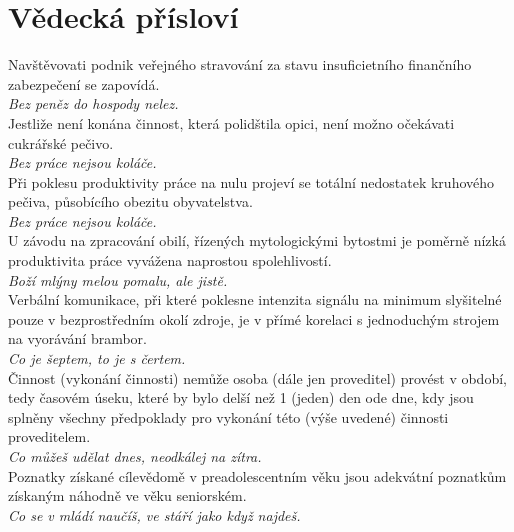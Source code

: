 
\section{Vědecká přísloví}
\begin{multicols}{2}

\noindent
Navštěvovati podnik veřejného stravování za stavu insuficietního
finančního zabezpečení se zapovídá.\\[1 mm]
{\sl Bez peněz do hospody nelez.}\\

\noindent
Jestliže není konána činnost, která polidštila opici, není
možno očekávati cukrářské pečivo.\\[1 mm]
{\sl Bez práce nejsou koláče.}\\

\noindent
Při poklesu produktivity práce na nulu projeví se totální
nedostatek kruhového pečiva, působícího obezitu obyvatelstva.\\[1 mm]
{\sl Bez práce nejsou koláče.}\\

\noindent
U závodu na zpracování obilí, řízených mytologickými bytostmi
je poměrně nízká produktivita práce vyvážena naprostou
spolehlivostí.\\[1 mm]
{\sl Boží mlýny melou pomalu, ale jistě.}\\

\noindent
Verbální komunikace, při které poklesne intenzita signálu na minimum
slyšitelné pouze v bezprostředním okolí zdroje, je v přímé korelaci
s jednoduchým strojem na vyorávání brambor.\\[1 mm]
{\sl Co je šeptem, to je s čertem.}\\

\noindent
Činnost (vykonání činnosti) nemůže osoba (dále jen proveditel)
provést v období, tedy časovém úseku, které by bylo delší než 1 (jeden)
den ode dne, kdy jsou splněny všechny předpoklady pro vykonání této
(výše uvedené) činnosti proveditelem.\\[1 mm]
{\sl Co můžeš udělat dnes, neodkálej na zítra.}\\

\noindent
Poznatky získané cílevědomě v preadolescentním věku jsou adekvátní
poznatkům získaným náhodně ve věku seniorském.\\[1 mm]
{\sl Co se v mládí naučíš, ve stáří jako když najdeš.}\\


\end{multicols}
